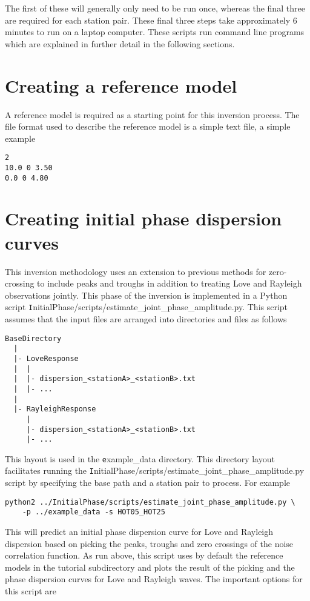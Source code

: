 \documentclass{article}
\begin{document}
The first of these will generally only need to be run once, whereas the final three
are required for each station pair. These final three steps take approximately
6 minutes to run on a laptop computer. These scripts run command line programs which
are explained in further detail in the following sections.

\section{Creating a reference model}

A reference model is required as a starting point for this inversion process. The file format used
to describe the reference model is a simple text file, a simple example

\begin{verbatim}
2
10.0 0 3.50
0.0 0 4.80
\end{verbatim}

\section{Creating initial phase dispersion curves}

This inversion methodology uses an extension to previous methods for zero-crossing to include peaks and
troughs in addition to treating Love and Rayleigh observations jointly. This phase of the inversion is
implemented in a Python script {\texttt InitialPhase/scripts/estimate\_joint\_phase\_amplitude.py}. This script
assumes that the input files are arranged into directories and files as follows

\begin{verbatim}
BaseDirectory
  |
  |- LoveResponse
  |  |
  |  |- dispersion_<stationA>_<stationB>.txt
  |  |- ...
  |
  |- RayleighResponse
     |
     |- dispersion_<stationA>_<stationB>.txt
     |- ...
\end{verbatim}

This layout is used in the {\texttt example\_data} directory. This directory layout facilitates running the
{\texttt InitialPhase/scripts/estimate\_joint\_phase\_amplitude.py} script by specifying the base path
and a station pair to process. For example

\begin{verbatim}
python2 ../InitialPhase/scripts/estimate_joint_phase_amplitude.py \
    -p ../example_data -s HOT05_HOT25 
\end{verbatim}

This will predict an initial phase dispersion curve for Love and Rayleigh dispersion based on picking
the peaks, troughs and zero crossings of the noise correlation function. As run above, this script
uses by default the reference models in the tutorial subdirectory and plots the result of the picking
and the phase dispersion curves for Love and Rayleigh waves. The important options for this script
are
\end{document}
